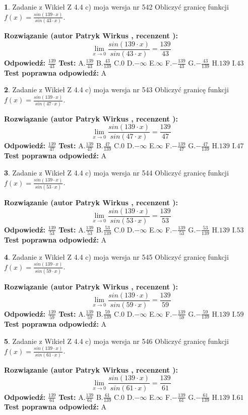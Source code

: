 \documentclass[12pt, a4paper]{article}
\theoremstyle{definition} %
\newtheorem{zad}{}
\newcommand{\zadStart}[1]{\begin{zad}#1\newline}
\newcommand{\zadStop}{\end{zad}}
\newcommand{\rozwStart}[2]{\noindent \textbf{Rozwiązanie (autor #1 , recenzent #2): }\newline}
\newcommand{\rozwStop}{\newline}
\newcommand{\odpStart}{\noindent \textbf{Odpowiedź:}\newline}
\newcommand{\odpStop}{\newline}
\newcommand{\testStart}{\noindent \textbf{Test:}\newline}
\newcommand{\testStop}{\newline}
\newcommand{\kluczStart}{\noindent \textbf{Test poprawna odpowiedź:}\newline}
\newcommand{\kluczStop}{\newline}
\begin{document}
\zadStart{Zadanie z Wikieł Z 4.4 c) moja wersja nr 542}
Obliczyć granicę funkcji $f(x)=\frac{sin(139\cdot x)}{sin(43\cdot x)}$.
\zadStop
\rozwStart{Patryk Wirkus}{}
$$\lim\limits_{x\to 0}\frac{sin(139\cdot x)}{sin(43\cdot x)}=
\frac{139}{43}$$
\rozwStop
\odpStart
$\frac{139}{43}$
\odpStop
\testStart
A.$\frac{139}{43}$
B.$\frac{43}{139}$
C.$0$
D.$-\infty$
E.$\infty$
F.$-\frac{139}{43}$
G.$-\frac{43}{139}$
H.$139$
I.$43$
\testStop
\kluczStart
A
\kluczStop



\zadStart{Zadanie z Wikieł Z 4.4 c) moja wersja nr 543}
Obliczyć granicę funkcji $f(x)=\frac{sin(139\cdot x)}{sin(47\cdot x)}$.
\zadStop
\rozwStart{Patryk Wirkus}{}
$$\lim\limits_{x\to 0}\frac{sin(139\cdot x)}{sin(47\cdot x)}=
\frac{139}{47}$$
\rozwStop
\odpStart
$\frac{139}{47}$
\odpStop
\testStart
A.$\frac{139}{47}$
B.$\frac{47}{139}$
C.$0$
D.$-\infty$
E.$\infty$
F.$-\frac{139}{47}$
G.$-\frac{47}{139}$
H.$139$
I.$47$
\testStop
\kluczStart
A
\kluczStop



\zadStart{Zadanie z Wikieł Z 4.4 c) moja wersja nr 544}
Obliczyć granicę funkcji $f(x)=\frac{sin(139\cdot x)}{sin(53\cdot x)}$.
\zadStop
\rozwStart{Patryk Wirkus}{}
$$\lim\limits_{x\to 0}\frac{sin(139\cdot x)}{sin(53\cdot x)}=
\frac{139}{53}$$
\rozwStop
\odpStart
$\frac{139}{53}$
\odpStop
\testStart
A.$\frac{139}{53}$
B.$\frac{53}{139}$
C.$0$
D.$-\infty$
E.$\infty$
F.$-\frac{139}{53}$
G.$-\frac{53}{139}$
H.$139$
I.$53$
\testStop
\kluczStart
A
\kluczStop



\zadStart{Zadanie z Wikieł Z 4.4 c) moja wersja nr 545}
Obliczyć granicę funkcji $f(x)=\frac{sin(139\cdot x)}{sin(59\cdot x)}$.
\zadStop
\rozwStart{Patryk Wirkus}{}
$$\lim\limits_{x\to 0}\frac{sin(139\cdot x)}{sin(59\cdot x)}=
\frac{139}{59}$$
\rozwStop
\odpStart
$\frac{139}{59}$
\odpStop
\testStart
A.$\frac{139}{59}$
B.$\frac{59}{139}$
C.$0$
D.$-\infty$
E.$\infty$
F.$-\frac{139}{59}$
G.$-\frac{59}{139}$
H.$139$
I.$59$
\testStop
\kluczStart
A
\kluczStop



\zadStart{Zadanie z Wikieł Z 4.4 c) moja wersja nr 546}
Obliczyć granicę funkcji $f(x)=\frac{sin(139\cdot x)}{sin(61\cdot x)}$.
\zadStop
\rozwStart{Patryk Wirkus}{}
$$\lim\limits_{x\to 0}\frac{sin(139\cdot x)}{sin(61\cdot x)}=
\frac{139}{61}$$
\rozwStop
\odpStart
$\frac{139}{61}$
\odpStop
\testStart
A.$\frac{139}{61}$
B.$\frac{61}{139}$
C.$0$
D.$-\infty$
E.$\infty$
F.$-\frac{139}{61}$
G.$-\frac{61}{139}$
H.$139$
I.$61$
\testStop
\kluczStart
A
\kluczStop
\end{document}
